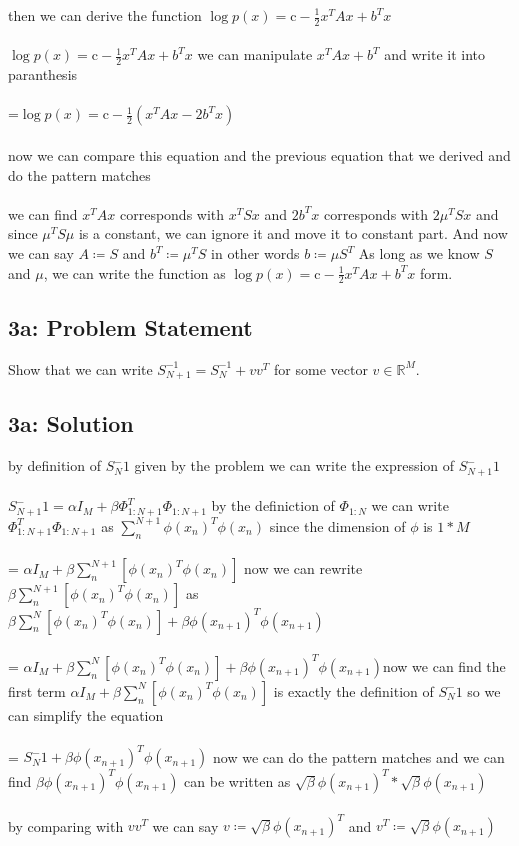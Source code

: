 \documentclass[10pt]{article}
\newcommand{\officialdirections}[1]{{\color{purple} #1}}
\begin{document}
then we can derive the function $\log p(x) = \text{c} - \frac{1}{2} x^T A x + b^T x$
\\
\\
$\log p(x) = \text{c} - \frac{1}{2} x^T A x + b^T x$ we can manipulate $x^T A x + b^T$ and write it into paranthesis
\\
\\
=$\log p(x) = \text{c} - \frac{1}{2} (x^T A x - 2b^T x)$
\\
\\
now we can compare this equation and the previous equation that we derived and do the pattern matches
\\
\\
we can find $x^T A x$ corresponds with $x^TSx$ and $2b^T x$ corresponds with $2\mu^TSx$ and since $\mu^TS\mu$ is a constant, we can ignore it and move it to constant part. And now we can say $A\coloneqq S$ and $b^T \coloneqq \mu^TS$ in other words $b \coloneqq  \mu{S^T}$ As long as we know $S$ and $\mu$, we can write the function as $\log p(x) = \text{c} - \frac{1}{2} x^T A x + b^T x$ form.


\officialdirections{
\subsection*{3a: Problem Statement}
Show that we can write $S_{N+1}^{-1} = S_N^{-1} + vv^T$ for some vector $v \in \mathbb{R}^M$.
}


\subsection{3a: Solution}
by definition of $S_N^-1$ given by the problem we can write the expression of $S_{N+1}^-1$
\\
\\
 $S_{N+1}^-1 = \alpha{I_M}+\beta{\Phi_{1:N+1}^T\Phi_{1:N+1}}$ by the definiction of $\Phi_{1:N}$ we can write $\Phi_{1:N+1}^T\Phi_{1:N+1}$ as $\sum_{n}^{N+1}\phi(x_n)^T\phi(x_n)$ since the dimension of $\phi$ is $1*M$
 \\
 \\
 = $\alpha{I_M}+\beta{\sum_{n}^{N+1}[\phi(x_n)^T\phi(x_n)]}$ now we can rewrite $\beta{\sum_{n}^{N+1}[\phi(x_n)^T\phi(x_n)]}$ as $\beta\sum_n^N[\phi(x_n)^T\phi(x_n)]+\beta\phi(x_{n+1})^T\phi(x_{n+1})$
 \\
 \\
 = $\alpha{I_M}+\beta\sum_n^N[\phi(x_n)^T\phi(x_n)]+\beta\phi(x_{n+1})^T\phi(x_{n+1})$now we can find the first term $\alpha{I_M}+\beta\sum_n^N[\phi(x_n)^T\phi(x_n)]$ is exactly the definition of $S_N^-1$ so we can simplify the equation 
 \\
 \\
 = $S_N^-1 + \beta\phi(x_{n+1})^T\phi(x_{n+1})$ now we can do the pattern matches and we can find $\beta\phi(x_{n+1})^T\phi(x_{n+1})$ can be written as $\sqrt{\beta}\phi(x_{n+1})^T*\sqrt{\beta}\phi(x_{n+1})$
 \\
 \\
 by comparing with $vv^T$ we can say $v \coloneqq \sqrt{\beta}\phi(x_{n+1})^T$ and $v^T \coloneqq \sqrt{\beta}\phi(x_{n+1})$
 
\end{document}
